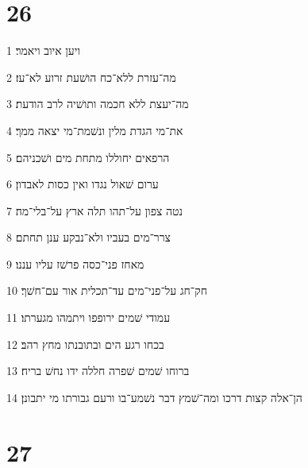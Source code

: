 \chapter{26}

\par 1 ויען איוב ויאמר׃
\par 2 מה־עזרת ללא־כח הושׁעת זרוע לא־עז׃
\par 3 מה־יעצת ללא חכמה ותושׁיה לרב הודעת׃
\par 4 את־מי הגדת מלין ונשׁמת־מי יצאה ממך׃
\par 5 הרפאים יחוללו מתחת מים ושׁכניהם׃
\par 6 ערום שׁאול נגדו ואין כסות לאבדון׃
\par 7 נטה צפון על־תהו תלה ארץ על־בלי־מה׃
\par 8 צרר־מים בעביו ולא־נבקע ענן תחתם׃
\par 9 מאחז פני־כסה פרשׁז עליו עננו׃
\par 10 חק־חג על־פני־מים עד־תכלית אור עם־חשׁך׃
\par 11 עמודי שׁמים ירופפו ויתמהו מגערתו׃
\par 12 בכחו רגע הים ובתובנתו מחץ רהב׃
\par 13 ברוחו שׁמים שׁפרה חללה ידו נחשׁ בריח׃
\par 14 הן־אלה קצות דרכו ומה־שׁמץ דבר נשׁמע־בו ורעם גבורתו מי יתבונן׃

\chapter{27}


